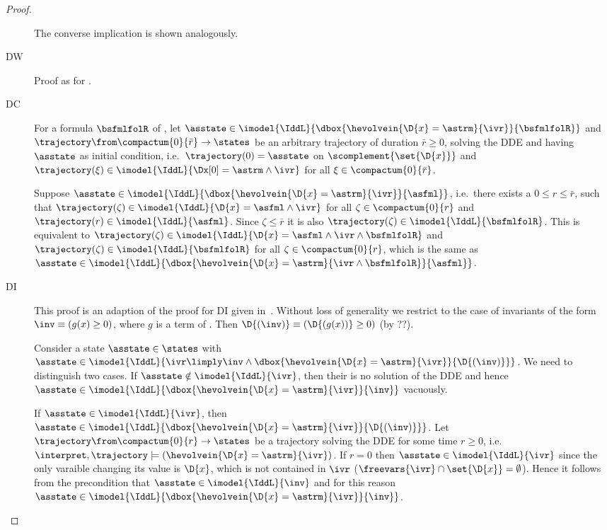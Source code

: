 \begin{proof}
\begin{description}
        The converse implication is shown analogously.

        \item[DW] Proof as for \dL.
        
        \item[DC] For a formula $\bsfmlfolR$ of \FOLR, let $\asstate\in\imodel{\IddL}{\dbox{\hevolvein{\D{x}=\astrm}{\ivr}}{\bsfmlfolR}}$ and $\trajectory\from\compactum{0}{\bar{r}}\to\states$ be an arbitrary trajectory of duration $\bar{r}\geq 0$, solving the DDE and having $\asstate$ as initial condition, i.e.\ $\trajectory(0)=\asstate$ on $\scomplement{\set{\D{x}}}$ and $\trajectory(\xi)\in\imodel{\IddL}{\Dx[0]=\astrm\land\ivr}$ for all $\xi\in\compactum{0}{\bar{r}}$.

        Suppose $\asstate\in\imodel{\IddL}{\dbox{\hevolvein{\D{x}=\astrm}{\ivr}}{\asfml}}$, i.e.\ there exists a $0\leq r\leq\bar{r}$, such that $\trajectory(\zeta)\in\imodel{\IddL}{\D{x}=\asfml\land\ivr}$ for all $\zeta\in\compactum{0}{r}$ and $\trajectory(r)\in\imodel{\IddL}{\asfml}$. Since $\zeta\leq\bar{r}$ it is also $\trajectory(\zeta)\in\imodel{\IddL}{\bsfmlfolR}$. This is equivalent to $\trajectory(\zeta)\in\imodel{\IddL}{\D{x}=\asfml\land\ivr\land\bsfmlfolR}$ and $\trajectory(\zeta)\in\imodel{\IddL}{\bsfmlfolR}$ for all $\zeta\in\compactum{0}{r}$, which is the same as $\asstate\in\imodel{\IddL}{\dbox{\hevolvein{\D{x}=\astrm}{\ivr\land\bsfmlfolR}}{\asfml}}$.

        \item[DI] This proof is an adaption of the \dL proof for DI given in~\cite{Platzer15Uniform}. Without loss of generality we restrict to the case of invariants of the form $\inv\equiv(g(x)\geq 0)$, where $g$ is a term of \FOLR. Then $\D{(\inv)}\equiv(\D{(g(x))}\geq 0)$ (by ??).

        Consider a state $\asstate\in\states$ with $\asstate\in\imodel{\IddL}{\ivr\limply\inv\land\dbox{\hevolvein{\D{x}=\astrm}{\ivr}}{\D{(\inv)}}}$. We need to distinguish two cases. If $\asstate\notin\imodel{\IddL}{\ivr}$, then their is no solution of the DDE and hence $\asstate\in\imodel{\IddL}{\dbox{\hevolvein{\D{x}=\astrm}{\ivr}}{\inv}}$ vacuously.

        If $\asstate\in\imodel{\IddL}{\ivr}$, then $\asstate\in\imodel{\IddL}{\dbox{\hevolvein{\D{x}=\astrm}{\ivr}}{\D{(\inv)}}}$. Let $\trajectory\from\compactum{0}{r}\to\states$ be a trajectory solving the DDE for some time $r\geq 0$, i.e.\ $\interpret,\trajectory\models(\hevolvein{\D{x}=\astrm}{\ivr})$.
        If $r=0$ then $\asstate\in\imodel{\IddL}{\ivr}$ since the only varaible changing its value is $\D{x}$, which is not contained in
        $\ivr$ ($\freevars{\ivr}\cap\set{\D{x}}=\emptyset$). Hence it follows from the precondition that $\asstate\in\imodel{\IddL}{\inv}$ and for this reason $\asstate\in\imodel{\IddL}{\dbox{\hevolvein{\D{x}=\astrm}{\ivr}}{\inv}}$.


\end{description}
\end{proof}
